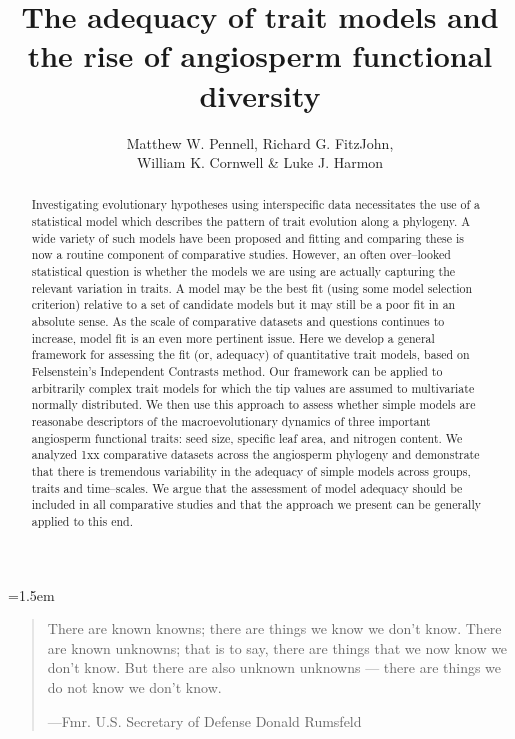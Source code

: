 \documentclass[12pt]{article}
\title{The adequacy of trait models and the rise of angiosperm functional diversity}
\author{
Matthew W. Pennell, Richard G. FitzJohn,\\
William K. Cornwell \& Luke J. Harmon
}
\date{}
\begin{document}
\maketitle
\parindent=1.5em
\addtolength{\parskip}{.3em}
\vfill


\begin{abstract}
Investigating evolutionary hypotheses using interspecific data necessitates the use of a statistical model which describes the pattern of trait evolution along a phylogeny. A wide variety of such models have been proposed and fitting and comparing these is now a routine component of comparative studies. However, an often over--looked statistical question is whether the models we are using are actually capturing the relevant variation in traits. A model may be the best fit (using some model selection criterion) relative to a set of candidate models but it may still be a poor fit in an absolute sense. As the scale of comparative datasets and questions continues to increase, model fit is an even more pertinent issue. Here we develop a general framework for assessing the fit (or, adequacy) of quantitative trait models, based on Felsenstein's Independent Contrasts method. Our framework can be applied to arbitrarily complex trait models for which the tip values are assumed to multivariate normally distributed. We then use this approach to assess whether simple models are reasonabe descriptors of the macroevolutionary dynamics of three important angiosperm functional traits: seed size, specific leaf area, and nitrogen content. We analyzed 1xx comparative datasets across the angiosperm phylogeny and demonstrate that there is tremendous variability in the adequacy of simple models across groups, traits and time--scales. We argue that the assessment of model adequacy should be included in all comparative studies and that the approach we present can be generally applied to this end.
\end{abstract}

\vfill

\newpage


\begin{quotation}
\noindent There are known knowns; there are things we know we don't know. There are known unknowns; that is to say, there are things that we now know we don't know. But there are also unknown unknowns --- there are things we do not know we don't know.

---Fmr. U.S. Secretary of Defense Donald Rumsfeld
\end{quotation}
\end{document}
